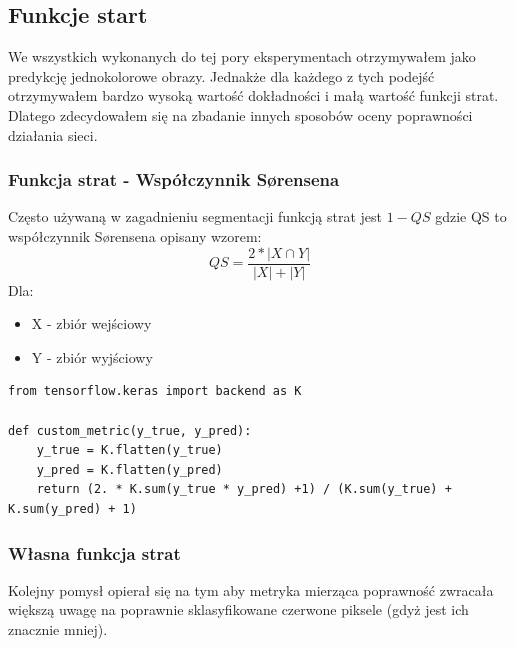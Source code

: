 \documentclass{article}
\begin{document}
\subsection{Funkcje start}
We wszystkich wykonanych do tej pory eksperymentach otrzymywałem jako predykcję jednokolorowe obrazy.
Jednakże dla każdego z tych podejść otrzymywałem bardzo wysoką wartość dokładności i małą wartość funkcji strat.
Dlatego zdecydowałem się na zbadanie innych sposobów oceny poprawności działania sieci.
\subsubsection{Funkcja strat - Współczynnik Sørensena}
Często używaną w zagadnieniu segmentacji funkcją strat jest $1-QS$ gdzie QS to współczynnik Sørensena opisany wzorem:
\begin{equation}
  QS = \frac{2*|X \cap Y|}{|X|+|Y|}
\end{equation}
Dla:
\begin{itemize}
  \item X - zbiór wejściowy
  \item Y - zbiór wyjściowy
\end{itemize}

\begin{lstlisting}[caption={Implementacja przy użyciu Keras i TensorFlow}]
from tensorflow.keras import backend as K

def custom_metric(y_true, y_pred):
    y_true = K.flatten(y_true)
    y_pred = K.flatten(y_pred)
    return (2. * K.sum(y_true * y_pred) +1) / (K.sum(y_true) + K.sum(y_pred) + 1)
\end{lstlisting}

\subsubsection{Własna funkcja strat}
Kolejny pomysł opierał się na tym aby metryka mierząca poprawność zwracała większą uwagę na poprawnie sklasyfikowane czerwone piksele (gdyż jest ich znacznie mniej).
\end{document}
